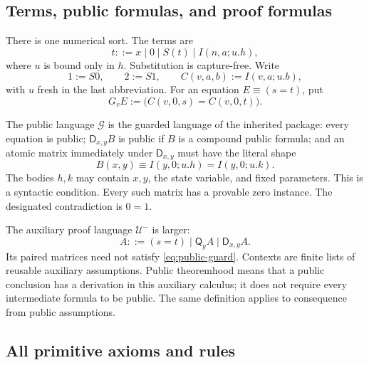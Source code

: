\documentclass[11pt,letterpaper]{article}
\theoremstyle{definition}\newtheorem{definition}[theorem]{Definition}
\theoremstyle{remark}\newtheorem{remark}[theorem]{Remark}
\newcommand{\D}{\mathsf D}
\newcommand{\Q}{\mathsf Q}
\newcommand{\G}{\mathcal G}
\newcommand{\U}{\mathcal U^{-}}
\begin{document}
\subsection{Terms, public formulas, and proof formulas}

There is one numerical sort.  The terms are
\[
 t ::= x\mid 0\mid S(t)\mid I(n,a;u.h),
\]
where $u$ is bound only in $h$.  Substitution is capture-free.  Write
\[
 1:=S0,\qquad 2:=S1,\qquad C(v,a,b):=I(v,a;u.b),
\]
with $u$ fresh in the last abbreviation.  For an equation $E\equiv(s=t)$,
put
\[
 G_v E := \bigl(C(v,0,s)=C(v,0,t)\bigr).
\]

The public language $\G$ is the guarded language of the inherited package:
every equation is public; $\D_{x,y}B$ is public if $B$ is a compound public
formula; and an atomic matrix immediately under $\D_{x,y}$ must have the
literal shape
\begin{equation}
 B(x,y)\equiv I(y,0;u.h)=I(y,0;u.k).
 \tag{G}\label{eq:public-guard}
\end{equation}
The bodies $h,k$ may contain $x,y$, the state variable, and fixed
parameters.  This is a syntactic condition.  Every such matrix has a
provable zero instance.  The designated contradiction is $0=1$.

The auxiliary proof language $\U$ is larger:
\[
 A ::= (s=t)\mid\Q_y A\mid\D_{x,y}A.
\]
Its paired matrices need not satisfy \eqref{eq:public-guard}.  Contexts are
finite lists of reusable auxiliary assumptions.  Public theoremhood means
that a public conclusion has a derivation in this auxiliary calculus; it
does not require every intermediate formula to be public.  The same
definition applies to consequence from public assumptions.

\subsection{All primitive axioms and rules}
\end{document}
